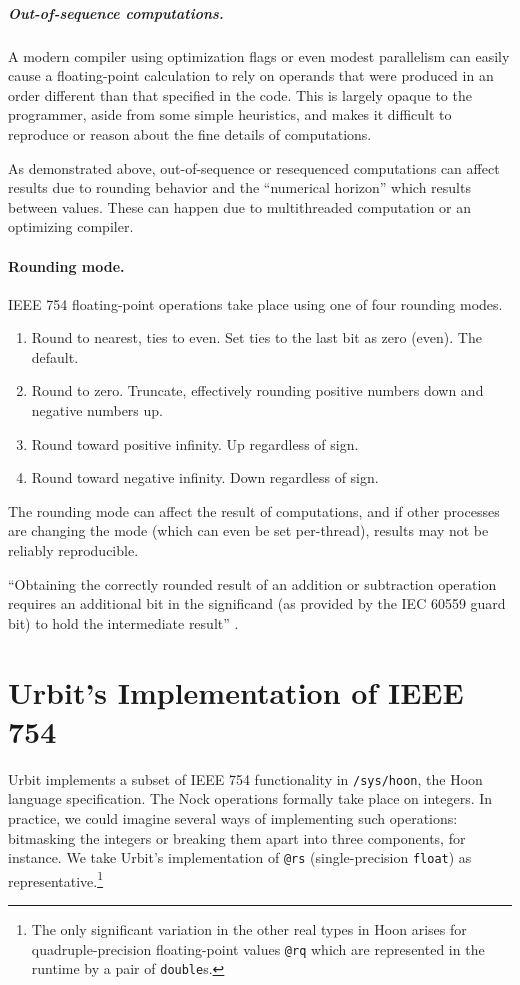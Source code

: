 \documentclass[twoside]{article}
\begin{document}
\subparagraph{Out-of-sequence computations.}

A modern compiler using optimization flags or even modest parallelism can easily cause a floating-point calculation to rely on operands that were produced in an order different than that specified in the code.  This is largely opaque to the programmer, aside from some simple heuristics, and makes it difficult to reproduce or reason about the fine details of computations.

As demonstrated above, out-of-sequence or resequenced computations can affect results due to rounding behavior and the “numerical horizon” which results between values.  These can happen due to multithreaded computation or an optimizing compiler.

\paragraph{Rounding mode.}

IEEE 754 floating-point operations take place using one of four rounding modes.

\begin{enumerate}
  \item  Round to nearest, ties to even.  Set ties to the last bit as zero (even).  The default.
  \item  Round to zero.  Truncate, effectively rounding positive numbers down and negative numbers up.
  \item  Round toward positive infinity.  Up regardless of sign.
  \item  Round toward negative infinity.  Down regardless of sign.
\end{enumerate}

\noindent
The rounding mode can affect the result of computations, and if other processes are changing the mode (which can even be set per-thread), results may not be reliably reproducible.

“Obtaining the correctly rounded result of an addition or subtraction operation requires an additional bit in the significand (as provided by the IEC 60559 guard bit) to hold the intermediate result” \citep[p.~65]{Jones2008}.


\section{Urbit's Implementation of IEEE 754}

Urbit implements a subset of IEEE 754 functionality in \lstinline[style=inlinecode]{/sys/hoon}, the Hoon language specification.  The Nock operations formally take place on integers.  In practice, we could imagine several ways of implementing such operations:  bitmasking the integers or breaking them apart into three components, for instance.  We take Urbit's implementation of \lstinline[style=inlinecode]{@rs} (single-precision \texttt{float}) as representative.\footnote{The only significant variation in the other real types in Hoon arises for quadruple-precision floating-point values \lstinline[style=inlinecode]{@rq} which are represented in the runtime by a pair of \texttt{double}s.}
\end{document}
